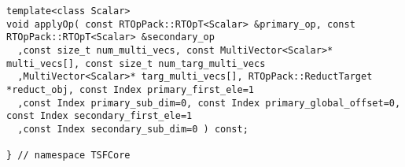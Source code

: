 {\begin{verbatim}
template<class Scalar>
void applyOp( const RTOpPack::RTOpT<Scalar> &primary_op, const RTOpPack::RTOpT<Scalar> &secondary_op
  ,const size_t num_multi_vecs, const MultiVector<Scalar>* multi_vecs[], const size_t num_targ_multi_vecs
  ,MultiVector<Scalar>* targ_multi_vecs[], RTOpPack::ReductTarget *reduct_obj, const Index primary_first_ele=1
  ,const Index primary_sub_dim=0, const Index primary_global_offset=0, const Index secondary_first_ele=1
  ,const Index secondary_sub_dim=0 ) const;

} // namespace TSFCore
\end{verbatim}}
